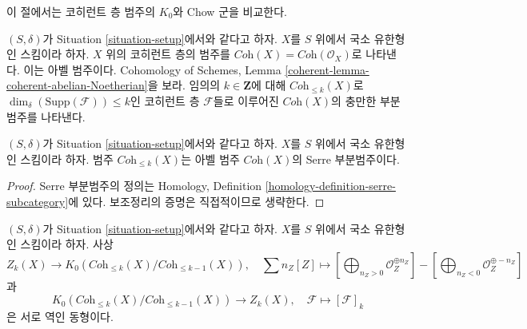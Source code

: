 \noindent
이 절에서는 코히런트 층 범주의 $K_0$와 Chow 군을 비교한다.

\medskip\noindent
$(S, \delta)$가 Situation \ref{situation-setup}에서와 같다고 하자.
$X$를 $S$ 위에서 국소 유한형인 스킴이라 하자.
$X$ 위의 코히런트 층의 범주를
$\textit{Coh}(X) = \textit{Coh}(\mathcal{O}_X)$로 나타낸다. 이는
아벨 범주이다. Cohomology of Schemes, Lemma
\ref{coherent-lemma-coherent-abelian-Noetherian}을 보라. 임의의
$k \in \mathbf{Z}$에 대해 $\textit{Coh}_{\leq k}(X)$로
$\dim_\delta(\text{Supp}(\mathcal{F})) \leq k$인 코히런트 층
$\mathcal{F}$들로 이루어진 $\textit{Coh}(X)$의 충만한 부분범주를
나타낸다.

\begin{lemma}
\label{lemma-Serre-subcategories}
$(S, \delta)$가 Situation \ref{situation-setup}에서와 같다고 하자.
$X$를 $S$ 위에서 국소 유한형인 스킴이라 하자. 범주
$\textit{Coh}_{\leq k}(X)$는 아벨 범주 $\textit{Coh}(X)$의
Serre 부분범주이다.
\end{lemma}

\begin{proof}
Serre 부분범주의 정의는 Homology, Definition
\ref{homology-definition-serre-subcategory}에 있다. 보조정리의 증명은
직접적이므로 생략한다.
\end{proof}

\begin{lemma}
\label{lemma-cycles-k-group}
$(S, \delta)$가 Situation \ref{situation-setup}에서와 같다고 하자.
$X$를 $S$ 위에서 국소 유한형인 스킴이라 하자. 사상
$$
Z_k(X)
\longrightarrow
K_0(\textit{Coh}_{\leq k}(X)/\textit{Coh}_{\leq k - 1}(X)),
\quad
\sum n_Z[Z] \mapsto
\left[\bigoplus\nolimits_{n_Z > 0} \mathcal{O}_Z^{\oplus n_Z}\right]
-
\left[\bigoplus\nolimits_{n_Z < 0} \mathcal{O}_Z^{\oplus -n_Z}\right]
$$
과
$$
K_0(\textit{Coh}_{\leq k}(X)/\textit{Coh}_{\leq k - 1}(X))
\longrightarrow
Z_k(X),\quad
\mathcal{F} \longmapsto [\mathcal{F}]_k
$$
은 서로 역인 동형이다.
\end{lemma}

